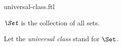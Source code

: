 \documentclass{naproche-library}
\begin{document}
\begin{smodule}[title=The Universal Class]{universal-class.ftl}

\begin{definition}[forthel,id=FOUNDATIONS_10_9625487120366325]
  $\emph{\Set}$ is the collection of all sets.

  Let the \emph{universal class} stand for $\Set$.
\end{definition}
\end{smodule}
\end{document}
